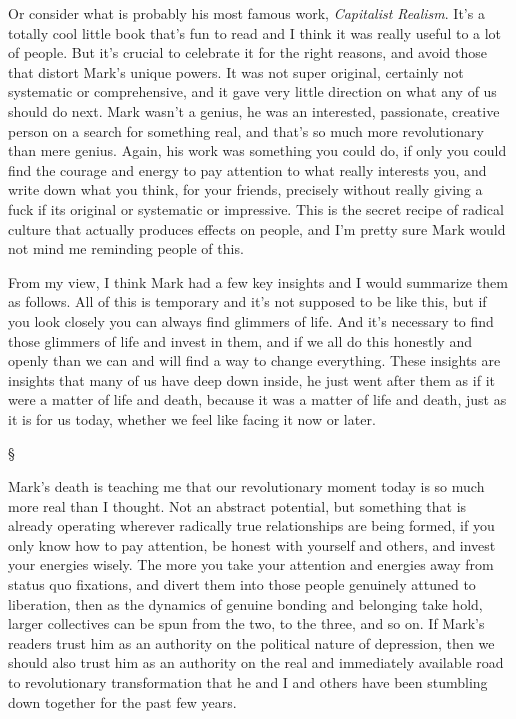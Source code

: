 \documentclass[a4paper,12pt,margin=.5in]{article}
\begin{document}
Or consider what is probably his most famous work, \emph{Capitalist
Realism}. It's a totally cool little book that's fun to read and I think
it was really useful to a lot of people. But it's crucial to celebrate
it for the right reasons, and avoid those that distort Mark's unique
powers. It was not super original, certainly not systematic or
comprehensive, and it gave very little direction on what any of us
should do next. Mark wasn't a genius, he was an interested, passionate,
creative person on a search for something real, and that's so much more
revolutionary than mere genius. Again, his work was something you could
do, if only you could find the courage and energy to pay attention to
what really interests you, and write down what you think, for your
friends, precisely without really giving a fuck if its original or
systematic or impressive. This is the secret recipe of radical culture
that actually produces effects on people, and I'm pretty sure Mark would
not mind me reminding people of this.

From my view, I think Mark had a few key insights and I would summarize
them as follows. All of this is temporary and it's not supposed to be
like this, but if you look closely you can always find glimmers of life.
And it's necessary to find those glimmers of life and invest in them,
and if we all do this honestly and openly than we can and will find a
way to change everything. These insights are insights that many of us
have deep down inside, he just went after them as if it were a matter of
life and death, because it was a matter of life and death, just as it is
for us today, whether we feel like facing it now or later.

§

Mark's death is teaching me that our revolutionary moment today is so
much more real than I thought. Not an abstract potential, but something
that is already operating wherever radically true relationships are
being formed, if you only know how to pay attention, be honest with
yourself and others, and invest your energies wisely. The more you take
your attention and energies away from status quo fixations, and divert
them into those people genuinely attuned to liberation, then as the
dynamics of genuine bonding and belonging take hold, larger collectives
can be spun from the two, to the three, and so on. If Mark's readers
trust him as an authority on the political nature of depression, then we
should also trust him as an authority on the real and immediately
available road to revolutionary transformation that he and I and others
have been stumbling down together for the past few years.
\end{document}
